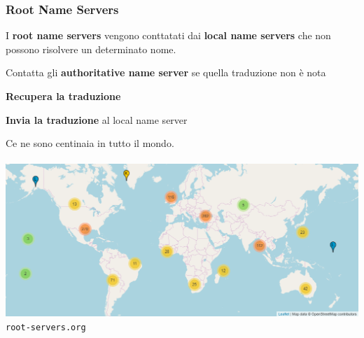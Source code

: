 \documentclass[10pt]{article}
\begin{document}
\subsubsection{Root Name Servers}
I \textbf{root name servers} vengono conttatati dai \textbf{local name servers} che non possono risolvere un determinato nome.
\begin{list}{}{Il root name server:}
\item Contatta gli \textbf{authoritative name server} se quella traduzione non è nota
\item \textbf{Recupera la traduzione}
\item \textbf{Invia la traduzione} al local name server
\end{list}
Ce ne sono centinaia in tutto il mondo.\\\\
\includegraphics[scale=0.65]{rootns.png}\\
\texttt{root-servers.org}\\
\end{document}

